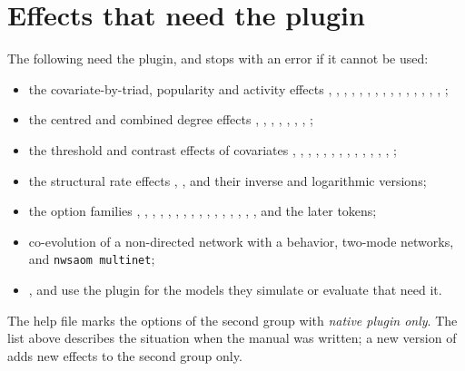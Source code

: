 \section{Effects that need the plugin}

The following need the plugin, and \nwsaom{} stops with an error if it cannot be used:
\begin{itemize}
\item the covariate-by-triad, popularity and activity effects , , , , , , , , , , , , , , , ;
\item the centred and combined degree effects , , , , , , , ;
\item the threshold and contrast effects of covariates , , , , , , , , , , , , , ;
\item the structural rate effects , ,  and their inverse and logarithmic versions;
\item the option families , , , , , , , , , , , , , , , ,  and the later  tokens;
\item co-evolution of a non-directed network with a behavior, two-mode networks, and \texttt{nwsaom multinet};
\item {},  and  use the plugin for the models they simulate or evaluate that need it.
\end{itemize}
The help file marks the options of the second group with \emph{native plugin only}. The list above describes the situation when the manual was written; a new version of \nwsaom{} adds new effects to the second group only.
